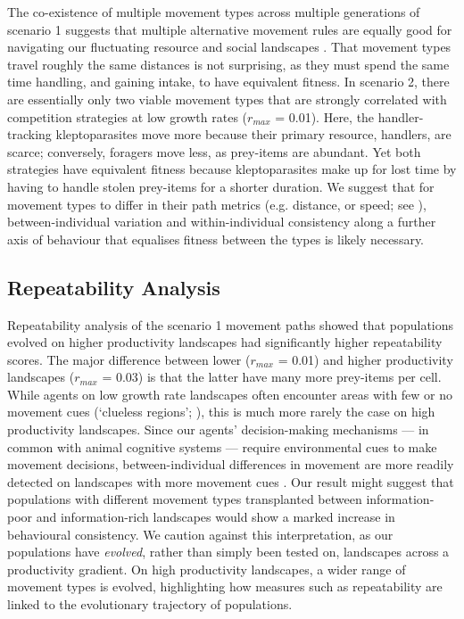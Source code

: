 The co-existence of multiple movement types across multiple generations of scenario 1 suggests that multiple alternative movement rules are equally good for navigating our fluctuating resource and social landscapes \citep[see also][]{getz2015,netz2021}.
That movement types travel roughly the same distances is not surprising, as they must spend the same time handling, and gaining intake, to have equivalent fitness.
In scenario 2, there are essentially only two viable movement types that are strongly correlated with competition strategies at low growth rates ($r_{max}$ = 0.01).
Here, the handler-tracking kleptoparasites move more because their primary resource, handlers, are scarce; conversely, foragers move less, as prey-items are abundant.
Yet both strategies have equivalent fitness because kleptoparasites make up for lost time by having to handle stolen prey-items for a shorter duration.
We suggest that for movement types to differ in their path metrics (e.g. distance, or speed; see \citealt{abrahms2017}), between-individual variation and within-individual consistency along a further axis of behaviour that equalises fitness between the types is likely necessary.

\subsection*{Repeatability Analysis}

Repeatability analysis of the scenario 1 movement paths showed that populations evolved on higher productivity landscapes had significantly higher repeatability scores.
The major difference between lower ($r_{max}$ = 0.01) and higher productivity landscapes ($r_{max}$ = 0.03) is that the latter have many more prey-items per cell.
While agents on low growth rate landscapes often encounter areas with few or no movement cues (`clueless regions'; \citealt{perkins1992}), this is much more rarely the case on high productivity landscapes.
Since our agents' decision-making mechanisms --- in common with animal cognitive systems --- require environmental cues to make movement decisions, between-individual differences in movement are more readily detected on landscapes with more movement cues \citep[see][]{carter2013a}.
Our result might suggest that populations with different movement types transplanted between information-poor and information-rich landscapes would show a marked increase in behavioural consistency.
We caution against this interpretation, as our populations have \textit{evolved}, rather than simply been tested on, landscapes across a productivity gradient.
On high productivity landscapes, a wider range of movement types is evolved, highlighting how measures such as repeatability are linked to the evolutionary trajectory of populations.

